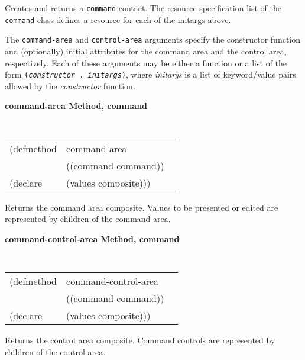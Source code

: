 \begin{flushright} \parbox[t]{6.125in}{
Creates and returns a {\tt command} contact.
The resource specification list of the {\tt command} class defines
a resource for each of the initargs above.

The {\tt command-area} and {\tt control-area} arguments specify the constructor
function and (optionally) initial attributes for the command area and the
control area,
respectively.  Each of these arguments may be either a function or a
list of the form {\tt ({\em constructor} .  {\em initargs})}, where {\em
initargs} is a list of keyword/value pairs allowed by the {\em constructor} function.
}\end{flushright}


{\samepage
{\large {\bf command-area \hfill Method, command}}
\begin{flushright} \parbox[t]{6.125in}{
\tt
\begin{tabular}{lll}
\raggedright
(defmethod & command-area & \\
           & ((command  command)) \\
(declare   & (values composite)))
\end{tabular}
\rm

}\end{flushright}}

\begin{flushright} \parbox[t]{6.125in}{
Returns the command area composite. Values to be presented or edited are
represented by children of the command area.

}\end{flushright}


{\samepage
{\large {\bf command-control-area \hfill Method, command}}
\begin{flushright} \parbox[t]{6.125in}{
\tt
\begin{tabular}{lll}
\raggedright
(defmethod & command-control-area & \\
           & ((command  command)) \\
(declare   & (values composite)))
\end{tabular}
\rm

}\end{flushright}}

\begin{flushright} \parbox[t]{6.125in}{ Returns the control area composite.
Command controls are represented by children of the control area.

}\end{flushright}


